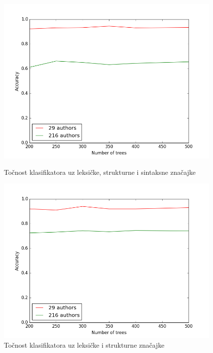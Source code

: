 \begin{figure}[H]
  \centering
  \begin{minipage}[b]{0.49\textwidth}
    \includegraphics[width=\textwidth]{fig/ig_sve_znacajke.png}
    \caption{Točnost klasifikatora uz leksičke, strukturne i sintaksne značajke}
    \label{sve_znacajke_ig}
  \end{minipage}
  \hfill
  \begin{minipage}[b]{0.49\textwidth}
    \includegraphics[width=\textwidth]{fig/leksicke_fs.png}
    \caption{Točnost klasifikatora uz leksičke i strukturne značajke}
    \label{leksicke_ig}
  \end{minipage}
\end{figure}

